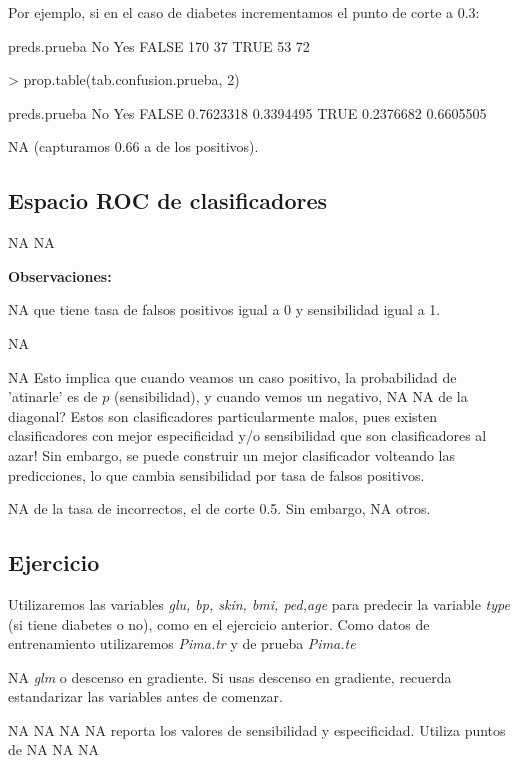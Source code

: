 \documentclass[nohyper]{tufte-handout}
\begin{document}
Por ejemplo, si en el caso de diabetes incrementamos el punto
de corte a 0.3:
\begin{Schunk}
\begin{Soutput}
preds.prueba  No Yes
       FALSE 170  37
       TRUE   53  72
\end{Soutput}
\begin{Sinput}
> prop.table(tab.confusion.prueba, 2)
\end{Sinput}
\begin{Soutput}
preds.prueba        No       Yes
       FALSE 0.7623318 0.3394495
       TRUE  0.2376682 0.6605505
\end{Soutput}
\end{Schunk}
NA
(capturamos 0.66 a de los positivos).

\subsection{Espacio ROC de clasificadores}
NA
NA



{\bf Observaciones:}
\begin{enumerate}
NA
que tiene tasa de falsos positivos igual a 0 y sensibilidad igual a 1.

NA

NA
Esto implica que cuando veamos un caso positivo, la probabilidad de 'atinarle' es de $p$ (sensibilidad), y cuando vemos un negativo,
NA
NA
de la diagonal? Estos son clasificadores particularmente malos,
pues existen clasificadores con mejor especificidad y/o sensibilidad que son clasificadores al azar! Sin embargo, se puede construir un mejor clasificador volteando las predicciones, lo que cambia sensibilidad por tasa de falsos positivos.
\end{enumerate}






NA
de la tasa de incorrectos, el de corte 0.5. Sin embargo,
NA
otros.

\subsection{Ejercicio}
Utilizaremos las variables {\em glu, bp, skin, bmi, ped,age} para predecir
la variable {\em type} (si tiene diabetes o no), como en el ejercicio anterior. 
Como datos de entrenamiento
utilizaremos {\em Pima.tr} y de prueba {\em Pima.te}
\begin{enumerate}


NA
{\em glm} o descenso en gradiente. 
Si usas descenso en gradiente, recuerda estandarizar las variables antes de comenzar.

NA
NA
NA
NA
reporta los valores de sensibilidad y especificidad. Utiliza puntos de 
NA
NA
NA

\end{enumerate}
\end{document}
